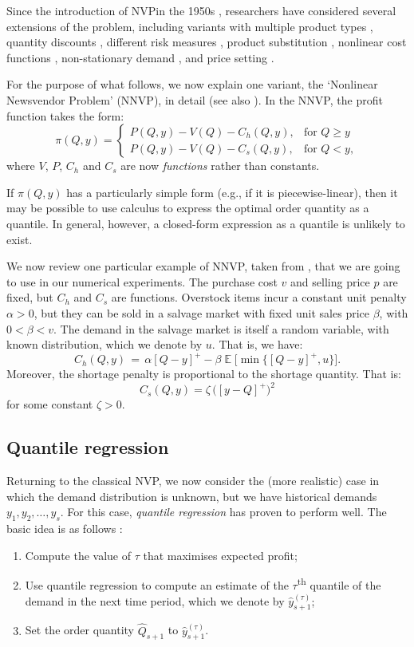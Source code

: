 \documentclass{article}
\DeclareMathOperator{\E}{\mathbb{E}}
\begin{document}
Since the introduction of NVPin the 1950s \cite{AHM51,MK51}, researchers have considered several extensions of the problem, including variants with multiple product types \cite{HW63,LL96,MS00}, quantity discounts \cite{Kh95}, different risk measures \cite{EGS95}, product substitution \cite{BAA99}, nonlinear cost functions \cite{HOS12}, non-stationary demand \cite{KWH15}, and price setting \cite{KC62,Mi59,PD99}.

For the purpose of what follows, we now explain one variant, the `Nonlinear Newsvendor Problem' (NNVP), in detail (see also \cite{BT06,HOS12,HN16,KC62,Kh95,KK18,Mi59,PSC15,PD99}). In the NNVP, the profit function takes the form:
\[
    \pi(Q,y)=
    \begin{cases}
        P(Q,y)-V(Q)-C_h(Q,y),& \text{for } Q \geq y\\
        P(Q,y)-V(Q)-C_s(Q,y),& \text{for } Q< y,
    \end{cases}
\]
where $V$, $P$, $C_h$ and $C_s$ are now \emph{functions} rather than constants.

If $\pi(Q,y)$ has a particularly simple form (e.g., if it is piecewise-linear), then it may be possible to  use calculus to express the optimal order quantity as a quantile. In general, however, a closed-form expression as a quantile is unlikely to exist.

We now review one particular example of NNVP, taken from \cite{KK18,PD99,RK02}, that we are going to use in our numerical experiments. The purchase cost $v$ and selling price $p$ are fixed, but $C_h$ and $C_s$ are functions. Overstock items incur a constant unit penalty $\alpha > 0$, but they can be sold in a salvage market with fixed unit sales price $\beta$, with $0<\beta<v$. The demand in the salvage market is itself a random variable, with known distribution, which we denote by $u$. That is, we have:
\[
    C_h(Q,y) \, = \, \alpha[Q-y]^{+} - \beta \E \Big[ \min \big\{ [Q-y]^{+},u \big\} \Big].
\]
Moreover, the shortage penalty is proportional to the shortage quantity. That is:
\[
C_s(Q,y) =  \zeta \, \big( [y-Q]^{+} \big)^2
\]
for some constant $\zeta > 0$.

\subsection{Quantile regression} %

Returning to the classical NVP, we now consider the (more realistic) case in which the demand distribution is unknown, but we have historical demands $y_1,y_2,\dots,y_s$.
For this case, \emph{quantile regression}
has proven to perform well. The basic idea is as follows \cite{BT06,Br16,CS19,HNS15,Hu19}:
\begin{enumerate}
\item Compute the value of $\tau$ that maximises expected profit;
\item Use quantile regression to compute an estimate of the $\tau$\textsuperscript{th} quantile of the demand in the next time period, which we denote by $\hat{y}_{s+1}^{(\tau)}$;
\item Set the order quantity $\hat{Q}_{s+1}$ to $\hat{y}_{s+1}^{(\tau)}$.
\end{enumerate}
\end{document}
